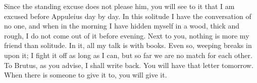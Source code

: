 

 Since the standing excuse does not please him, you will see to it that I am excused before Appuleius day by day. In this solitude I have the conversation of no one, and when in the morning I have hidden myself in a wood, thick and rough, I do not come out of it before evening. Next to you, nothing is more my friend than solitude. In it, all my talk is with books. Even so, weeping breaks in upon it; I fight it off as long as I can, but so far we are no match for each other. To Brutus, as you advise, I shall write back. You will have that letter tomorrow. When there is someone to give it to, you will give it.
